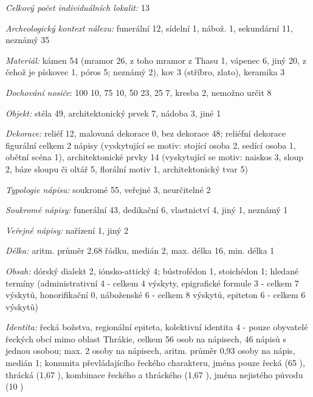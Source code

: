 {\em Celkový počet individuálních lokalit:} 13

{\em Archeologický kontext nálezu:} funerální 12, sídelní 1, nábož. 1, sekundární 11, neznámý 35

{\em Materiál:} kámen 54 (mramor 26, z toho mramor z Thasu 1, vápenec 6, jiný 20, z čehož je pískovec 1, póros 5; neznámý 2), kov 3 (stříbro, zlato), keramika 3

{\em Dochování nosiče}: 100  10, 75  10, 50  23, 25  7, kresba 2, nemožno určit 8

{\em Objekt:} stéla 49, architektonický prvek 7, nádoba 3, jiné 1

{\em Dekorace:} reliéf 12, malovaná dekorace 0, bez dekorace 48; reliéfní dekorace figurální celkem 2 nápisy (vyskytující se motiv: stojící osoba 2, sedící osoba 1, obětní scéna 1), architektonické prvky 14 (vyskytující se motiv: naiskos 3, sloup 2, báze sloupu či oltář 5, florální motiv 1, architektonický tvar 5)

{\em Typologie nápisu:} soukromé 55, veřejné 3, neurčitelné 2

{\em Soukromé nápisy:} funerální 43, dedikační 6, vlastnictví 4, jiný 1, neznámý 1

{\em Veřejné nápisy:} nařízení 1, jiný 2

{\em Délka:} aritm. průměr 2,68 řádku, medián 2, max. délka 16, min. délka 1

{\em Obsah:} dórský dialekt 2, iónsko-attický 4; bústrofédon 1, stoichédon 1; hledané termíny (administrativní 4 - celkem 4 výskyty, epigrafické formule 3 - celkem 7 výskytů, honorifikační 0, náboženské 6 - celkem 8 výskytů, epiteton 6 - celkem 6 výskytů)

{\em Identita:} řecká božstva, regionální epiteta, kolektivní identita 4 - pouze obyvatelé řeckých obcí mimo oblast Thrákie, celkem 56 osob na nápisech, 46 nápisů s jednou osobou; max. 2 osoby na nápisech, aritm. průměr 0,93 osoby na nápis, medián 1; komunita převládajícího řeckého charakteru, jména pouze řecká (65 ), thrácká (1,67 ), kombinace řeckého a thráckého (1,67 ), jména nejistého původu (10 )

\NC\AR
\HL
\HL
\stoptable

